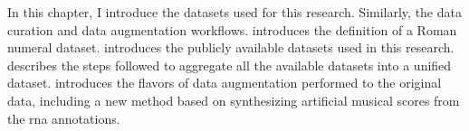 
In this chapter, I introduce the datasets used for this
research. Similarly, the data curation and data augmentation
workflows.  introduces the
definition of a Roman numeral dataset.
 introduces the publicly available
datasets used in this research.
 describes the steps
followed to aggregate all the available datasets into a
unified dataset.  introduces the
flavors of data augmentation performed to the original data,
including a new method based on synthesizing artificial
musical scores from the \gls{rna} annotations.
